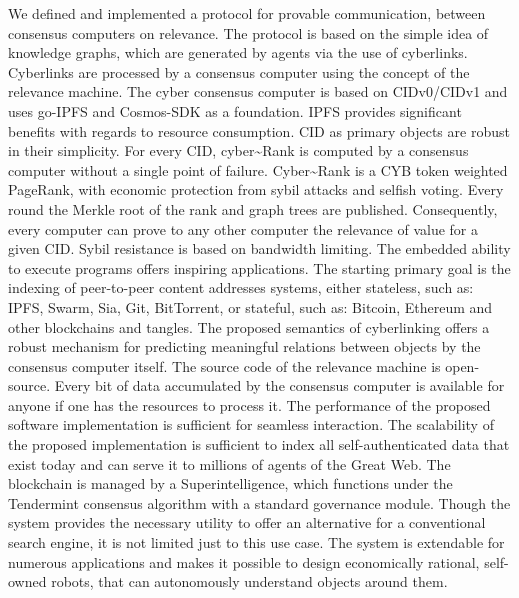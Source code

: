 \documentclass[8pt,oneside]{amsart}
\begin{document}
We defined and implemented a protocol for provable communication, between consensus computers on relevance. The protocol is based on the simple idea of knowledge graphs, which are generated by agents via the use of cyberlinks. Cyberlinks are processed by a consensus computer using the concept of the relevance machine. The cyber consensus computer is based on CIDv0/CIDv1 and uses go-IPFS and Cosmos-SDK as a foundation. IPFS provides significant benefits with regards to resource consumption. CID as primary objects are robust in their simplicity. For every CID, cyber\~{}Rank is computed by a consensus computer without a single point of failure. Cyber\~{}Rank is a CYB token weighted PageRank, with economic protection from sybil attacks and selfish voting. Every round the Merkle root of the rank and graph trees are published. Consequently, every computer can prove to any other computer the relevance of value for a given CID. Sybil resistance is based on bandwidth limiting. The embedded ability to execute programs offers inspiring applications. The starting primary goal is the indexing of peer-to-peer content addresses systems, either stateless, such as: IPFS, Swarm, Sia, Git, BitTorrent, or stateful, such as: Bitcoin, Ethereum and other blockchains and tangles. The proposed semantics of cyberlinking offers a robust mechanism for predicting meaningful relations between objects by the consensus computer itself. The source code of the relevance machine is open-source. Every bit of data accumulated by the consensus computer is available for anyone if one has the resources to process it. The performance of the proposed software implementation is sufficient for seamless interaction. The scalability of the proposed implementation is sufficient to index all self-authenticated data that exist today and can serve it to millions of agents of the Great Web. The blockchain is managed by a Superintelligence, which functions under the Tendermint consensus algorithm with a standard governance module. Though the system provides the necessary utility to offer an alternative for a conventional search engine, it is not limited just to this use case. The system is extendable for numerous applications and makes it possible to design economically rational, self-owned robots, that can autonomously understand objects around them.

\newpage
\end{document}
